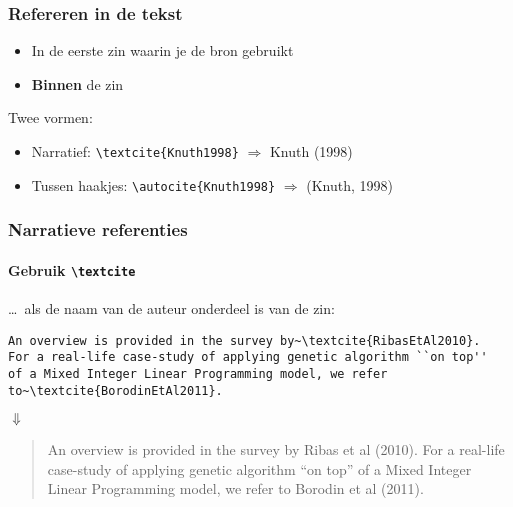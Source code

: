 \documentclass[aspectratio=169]{beamer}
\begin{document}
\begin{frame}[fragile]
  \frametitle{Refereren in de tekst}

  \begin{itemize}
    \item In de eerste zin waarin je de bron gebruikt
    \item \textcolor{hgorange}{\textbf{Binnen}} de zin
  \end{itemize}

  \bigskip
  Twee vormen:

  \begin{itemize}
    \item Narratief: \verb|\textcite{Knuth1998}| \(\Rightarrow{}\) Knuth (1998)
    \item Tussen haakjes: \verb|\autocite{Knuth1998}| \(\Rightarrow{}\) (Knuth, 1998)
  \end{itemize}

\end{frame}

\begin{frame}
  \frametitle{Narratieve referenties}
  \framesubtitle{Gebruik \texttt{\textbackslash{}textcite}}

  \ldots\ als de naam van de auteur onderdeel is van de zin:

  \bigskip

  \small
  \begin{verbatim}
An overview is provided in the survey by~\textcite{RibasEtAl2010}.
For a real-life case-study of applying genetic algorithm ``on top''
of a Mixed Integer Linear Programming model, we refer
to~\textcite{BorodinEtAl2011}.
\end{verbatim}
  \normalsize

  \begin{center}
    $\Downarrow$
  \end{center}

  \begin{quotation}
    An overview is provided in the survey by Ribas et al (2010). For a real-life case-study of applying genetic algorithm ``on top'' of a Mixed Integer Linear Programming model, we refer to Borodin et al (2011).
  \end{quotation}
\end{frame}
\end{document}
